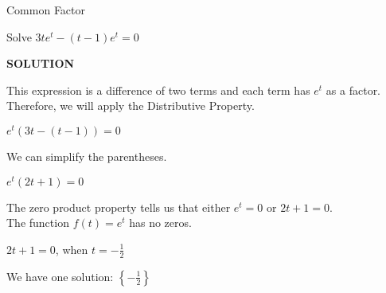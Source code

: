 \documentclass{ximera}
\begin{document}
\begin{example} Common Factor


Solve $3t e^t - (t-1) e^t = 0$

\textbf{\textcolor{purple!50!blue!90!black}{SOLUTION}}



This expression is a difference of two terms and each term has $e^t$ as a factor.  Therefore, we will apply the Distributive Property.



$e^t (3t - (t-1))= 0$


We can simplify the parentheses.



$e^t (2t +1)= 0$



The zero product property tells us that either $e^t = 0$ or $2t + 1 = 0$.  \\

The function $f(t) = e^t$ has no zeros. 


$2t + 1 = 0$, when $t = -\frac{1}{2}$

We have one solution: $\left\{ -\frac{1}{2} \right\}$


\end{example}
\end{document}
